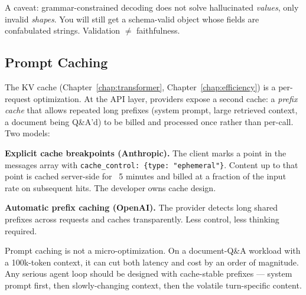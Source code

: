 A caveat: grammar-constrained decoding does not solve
hallucinated \emph{values}, only invalid \emph{shapes}. You will
still get a schema-valid object whose fields are confabulated
strings. Validation $\neq$ faithfulness.

\subsection{Prompt Caching}
\label{sec:wk11_prefix_cache}

The KV cache (Chapter~\ref{chap:transformer}, Chapter~\ref{chap:efficiency}) is a per-request optimization. At
the API layer, providers expose a second cache: a \emph{prefix
cache} that allows repeated long prefixes (system prompt, large
retrieved context, a document being Q\&A'd) to be billed and
processed once rather than per-call. Two models:

\textbf{Explicit cache breakpoints (Anthropic).} The client marks
a point in the messages array with \texttt{cache\_control:
\{type: "ephemeral"\}}. Content up to that point is cached
server-side for ~5 minutes and billed at a fraction of the input
rate on subsequent hits. The developer owns cache design.

\textbf{Automatic prefix caching (OpenAI).} The provider detects
long shared prefixes across requests and caches transparently.
Less control, less thinking required.

Prompt caching is not a micro-optimization. On a document-Q\&A
workload with a 100k-token context, it can cut both latency and
cost by an order of magnitude. Any serious agent loop should be
designed with cache-stable prefixes --- system prompt first, then
slowly-changing context, then the volatile turn-specific content.

